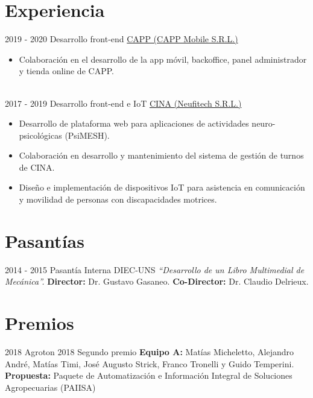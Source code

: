 \documentclass[letterpaper]{twentysecondcv} %
\begin{document}
\section{Experiencia}
\begin{twenty} 
\twentyitem
        {2019 - 2020}
        {}
        {Desarrollo front-end}
        {\href{http://www.webcapp.com/}{CAPP (CAPP Mobile S.R.L.)}}
        {}
        {\begin{itemize}
        \item Colaboración en el desarrollo de la app móvil, backoffice, panel administrador y tienda online de CAPP.
        \end{itemize}}\\
\twentyitem
        {2017 - 2019}
        {}
        {Desarrollo front-end e IoT}
        {\href{http://www.cinaweb.org/}{CINA (Neufitech S.R.L.)}}
        {}
        {\begin{itemize}
        \item Desarrollo de plataforma web para aplicaciones de actividades neuro-psicológicas (PsiMESH).
        \item Colaboración en desarrollo y mantenimiento del sistema de gestión de turnos de CINA.
        \item Diseño e implementación de dispositivos IoT para asistencia en comunicación y movilidad de personas con discapacidades motrices.
        \end{itemize}}
\end{twenty}

\vspace{2mm}

\section{Pasantías}
\begin{twenty}
    \twentyitem
        {2014 - 2015}
        {}
        {Pasantía Interna}
        {DIEC-UNS}
        {\textit{``Desarrollo de un Libro Multimedial de Mecánica''.}}
        {\textbf{Director:} Dr. Gustavo Gasaneo. \textbf{Co-Director:} Dr. Claudio Delrieux.} \\
\end{twenty}

\section{Premios}
\begin{twenty}
    \twentyitem
        {2018}
        {}
        {Agroton 2018}
        {Segundo premio}
        {\textbf{Equipo A:} Matías Micheletto, Alejandro André, Matías Timi, José Augusto Strick, Franco Tronelli y Guido Temperini.}
        {\textbf{Propuesta:} Paquete de Automatización e Información Integral de Soluciones Agropecuarias (PAIISA)}
\end{twenty}
\end{document}
